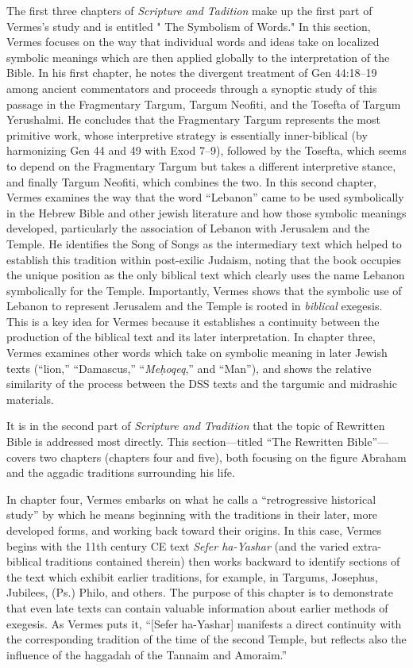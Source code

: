 The first three chapters of \emph{Scripture and Tadition} make up the
first part of Vermes's study and is entitled " The Symbolism of Words."
In this section, Vermes focuses on the way that individual words and
ideas take on localized symbolic meanings which are then applied
globally to the interpretation of the Bible. In his first chapter, he
notes the divergent treatment of Gen 44:18--19 among ancient
commentators and proceeds through a synoptic study of this passage in
the Fragmentary Targum, Targum Neofiti, and the Tosefta of Targum
Yerushalmi. He concludes that the Fragmentary Targum represents the most
primitive work, whose interpretive strategy is essentially
inner-biblical (by harmonizing Gen 44 and 49 with Exod 7--9), followed
by the Tosefta, which seems to depend on the Fragmentary Targum but
takes a different interpretive stance, and finally Targum Neofiti, which
combines the two. In this second chapter, Vermes examines the way that
the word ``Lebanon'' came to be used symbolically in the Hebrew Bible
and other jewish literature and how those symbolic meanings developed,
particularly the association of Lebanon with Jerusalem and the Temple.
He identifies the Song of Songs as the intermediary text which helped to
establish this tradition within post-exilic Judaism, noting that the
book occupies the unique position as the only biblical text which
clearly uses the name Lebanon symbolically for the Temple. Importantly,
Vermes shows that the symbolic use of Lebanon to represent Jerusalem and
the Temple is rooted in \emph{biblical} exegesis. This is a key idea for
Vermes because it establishes a continuity between the production of the
biblical text and its later interpretation. In chapter three, Vermes
examines other words which take on symbolic meaning in later Jewish
texts (``lion,'' ``Damascus,'' ``\emph{Meḥoqeq},'' and ``Man''), and
shows the relative similarity of the process between the DSS texts and
the targumic and midrashic materials.

It is in the second part of \emph{Scripture and Tradition} that the
topic of Rewritten Bible is addressed most directly. This
section---titled ``The Rewritten Bible''--- covers two chapters
(chapters four and five), both focusing on the figure Abraham and the
aggadic traditions surrounding his life.

In chapter four, Vermes embarks on what he calls a ``retrogressive
historical study'' by which he means beginning with the traditions in
their later, more developed forms, and working back toward their
origins. In this case, Vermes begins with the 11th century CE text
\emph{Sefer ha-Yashar} (and the varied extra-biblical traditions
contained therein) then works backward to identify sections of the text
which exhibit earlier traditions, for example, in Targums, Josephus,
Jubilees, (Ps.) Philo, and others. The purpose of this chapter is to
demonstrate that even late texts can contain valuable information about
earlier methods of exegesis. As Vermes puts it, ``{[}Sefer ha-Yashar{]}
manifests a direct continuity with the corresponding tradition of the
time of the second Temple, but reflects also the influence of the
haggadah of the Tannaim and Amoraim.''\autocite[95]{vermes1961}

